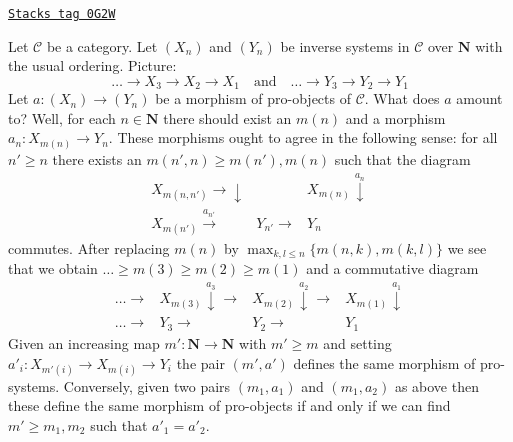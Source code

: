 \begin{example}
\label{categories-example-pro-morphism-inverse-systems}
\href{https://stacks.math.columbia.edu/tag/0G2W}{\texttt{Stacks tag 0G2W}}

Let $\mathcal{C}$ be a category. Let $(X_n)$ and $(Y_n)$ be inverse
systems in $\mathcal{C}$ over $\mathbf{N}$ with the usual ordering.
Picture:
$$
\ldots \to X_3 \to X_2 \to X_1
\quad\text{and}\quad
\ldots \to Y_3 \to Y_2 \to Y_1
$$
Let $a : (X_n) \to (Y_n)$ be a morphism of pro-objects of $\mathcal{C}$.
What does $a$ amount to? Well, for each $n \in \mathbf{N}$ there should
exist an $m(n)$ and a morphism $a_n : X_{m(n)} \to Y_n$. These morphisms
ought to agree in the following sense: for all $n' \geq n$ there exists an
$m(n', n) \geq m(n'), m(n)$ such that the diagram
$$
\begin{array}{ccc}X_{m(n, n')} \longrightarrow\downarrow &  & X_{m(n)} \overset{a_n}{\downarrow} \\ X_{m(n')} \overset{a_{n'}}{\longrightarrow} & Y_{n'} \longrightarrow & Y_n\end{array}
$$
commutes. After replacing $m(n)$ by $\max_{k, l \leq n}\{m(n, k), m(k, l)\}$
we see that we obtain $\ldots \geq m(3) \geq m(2) \geq m(1)$ and a commutative
diagram
$$
\begin{array}{cccc}\ldots \longrightarrow & X_{m(3)} \overset{a_3}{\downarrow}\longrightarrow & X_{m(2)} \overset{a_2}{\downarrow}\longrightarrow & X_{m(1)} \overset{a_1}{\downarrow} \\ \ldots \longrightarrow & Y_3 \longrightarrow & Y_2 \longrightarrow & Y_1\end{array}
$$
Given an increasing map $m' : \mathbf{N} \to \mathbf{N}$ with $m' \geq m$
and setting $a'_i : X_{m'(i)} \to X_{m(i)} \to Y_i$ the pair
$(m', a')$ defines the same morphism of pro-systems. Conversely, given
two pairs $(m_1, a_1)$ and $(m_1, a_2)$ as above then these define the same
morphism of pro-objects if and only if we can find $m' \geq m_1, m_2$
such that $a'_1 = a'_2$.
\end{example}

